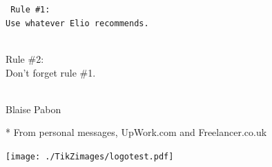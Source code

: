    \centerfleuron{\adfflatleafsolidleft}


    \vfill
    \begin{center}\LARGE\tt
        Rule \#1:\\
        Use whatever Elio recommends.\\
        \strut\\
        Rule \#2:\\
        Don't forget rule \#1.\\
        \strut\\
        \large Blaise Pabon
    \end{center}
    \vfill
    * From personal messages, UpWork.com and Freelancer.co.uk

    \clearpage
    

    \clearpage
    \null
    \vfill
    \begin{center}
    \texttt{[image: ./TikZimages/logotest.pdf]}
    \end{center}
    \vfill
    \null

